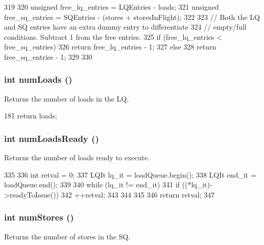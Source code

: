 \begin{DoxyCode}
319 {
320     unsigned free_lq_entries = LQEntries - loads;
321     unsigned free_sq_entries = SQEntries - (stores + storesInFlight);
322 
323     // Both the LQ and SQ entries have an extra dummy entry to differentiate
324     // empty/full conditions.  Subtract 1 from the free entries.
325     if (free_lq_entries < free_sq_entries) {
326         return free_lq_entries - 1;
327     } else {
328         return free_sq_entries - 1;
329     }
330 }
\end{DoxyCode}
\hypertarget{classOzoneLWLSQ_a54460b759fb06e2b18e26657279a6f49}{
\subsubsection[{numLoads}]{\setlength{\rightskip}{0pt plus 5cm}int numLoads ()}}
\label{classOzoneLWLSQ_a54460b759fb06e2b18e26657279a6f49}
Returns the number of loads in the LQ. 


\begin{DoxyCode}
181 { return loads; }
\end{DoxyCode}
\hypertarget{classOzoneLWLSQ_a9aa5d5a61b2229931008ac2ea802a3ab}{
\subsubsection[{numLoadsReady}]{\setlength{\rightskip}{0pt plus 5cm}int numLoadsReady ()}}
\label{classOzoneLWLSQ_a9aa5d5a61b2229931008ac2ea802a3ab}
Returns the number of loads ready to execute. 


\begin{DoxyCode}
335 {
336     int retval = 0;
337     LQIt lq_it = loadQueue.begin();
338     LQIt end_it = loadQueue.end();
339 
340     while (lq_it != end_it) {
341         if ((*lq_it)->readyToIssue()) {
342             ++retval;
343         }
344     }
345 
346     return retval;
347 }
\end{DoxyCode}
\hypertarget{classOzoneLWLSQ_aa0fc32a4a9d77696f5907f4d25e7d07f}{
\subsubsection[{numStores}]{\setlength{\rightskip}{0pt plus 5cm}int numStores ()}}
\label{classOzoneLWLSQ_aa0fc32a4a9d77696f5907f4d25e7d07f}
Returns the number of stores in the SQ. 


